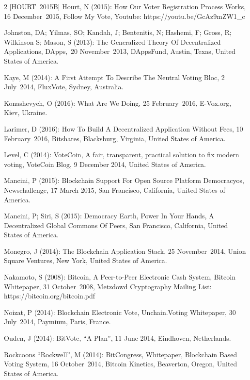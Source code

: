 \documentclass[9pt,oneside]{amsart}
\begin{document}
\begin{multicols}{2}
[HOURT~2015B] Hourt, N (2015): How Our Voter Registration Process Works, 16 December~2015, Follow My Vote, Youtube: https://youtu.be/GcAz9mZW1\_c\par
[JOHNSTON~et~al.~2013] Johnston, DA; Yilmas, SO; Kandah, J; Bentenitis, N; Hashemi, F; Gross, R; Wilkinson S; Mason, S (2013): The Generalized Theory Of Decentralized Applications, DApps,~20 November~2013, DAppsFund, Austin, Texas, United States of America.\par
[KAYE~2014] Kaye, M (2014): A First Attempt To Describe The Neutral Voting Bloc, 2 July~2014, FluxVote, Sydney, Australia.\par
[KONASHEVYCH~2016] Konashevych, O (2016): What Are We Doing, 25 February~2016, E-Vox.org, Kiev, Ukraine.\par
[LARIMER~2016] Larimer, D (2016): How To Build A Decentralized Application Without Fees, 10 February~2016, Bitshares, Blacksburg, Virginia, United States of America.\par
[LEVEL~2014] Level, C (2014): VoteCoin, A fair, transparent, practical solution to fix modern voting, VoteCoin Blog, 9 December 2014, United States of America.\par
[MANCINI~2015] Mancini, P (2015): Blockchain Support For Open Source Platform Democracyos, Newschallenge, 17 March 2015, San Francisco, California, United States of America.\par
[MANCINI~et~al.~2015] Mancini, P; Siri, S (2015): Democracy Earth, Power In Your Hands, A Decentralized Global Commons Of Peers, San Francisco, California, United States of America.\par
[MONEGRO~2014] Monegro, J (2014): The Blockchain Application Stack, 25 November~2014, Union Square Ventures, New York, United States of America.\par
[NAKAMOTO~2008] Nakamoto, S (2008): Bitcoin, A Peer-to-Peer Electronic Cash System, Bitcoin Whitepaper, 31 October~2008, Metzdowd Cryptography Mailing List: https://bitcoin.org/bitcoin.pdf\par
[NOIZAT~2014] Noizat, P (2014): Blockchain Electronic Vote, Unchain.Voting Whitepaper, 30 July~2014, Paymium, Paris, France.\par
[OUDEN~2014] Ouden, J (2014): BitVote, \enquote{A-Plan}, 11 June 2014, Eindhoven, Netherlands.\par
[ROCKWELL~2014] Rockcoons \enquote{Rockwell}, M (2014): BitCongress, Whitepaper, Blockchain Based Voting System, 16 October~2014, Bitcoin Kinetics, Beaverton, Oregon, United States of America.\par

\end{multicols}
\end{document}
